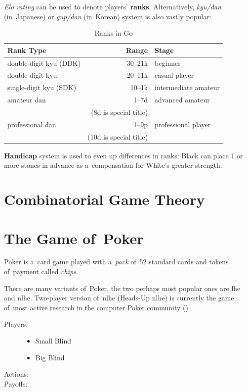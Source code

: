 \emph{Elo rating} can be used to denote players' \textbf{ranks}.
Alternatively, \emph{kyu/dan} (in~Japanese) or \emph{gup/dan} (in~Korean) system is also vastly popular:
\begin{table}[!htbp]
  \centering
  \begin{tabular}{ |l|r|l| }
    \hline
    \textbf{Rank Type} & \textbf{Range} & \textbf{Stage} \\
    \hline
    double-digit kyu\footnotemark{} (DDK) & 30--21k & beginner \\
    double-digit kyu                      & 20--11k & casual player \\
    single-digit kyu (SDK)                & 10--1k  & intermediate amateur \\
    amateur dan                           & 1--7d   & advanced amateur \\
    ~ & (8d is special title) & ~ \\
    professional dan                      & 1--9p   & professional player \\
    ~ & (10d is special title) & ~ \\
    \hline
  \end{tabular}
  \caption{Ranks in Go}
  \label{tab:Go-ranks}
\end{table}

\textbf{Handicap} system is used to even up differences in ranks:
Black can place 1 or more stones in advance as a~compensation for White's greater strength.

\section{Combinatorial Game Theory}
\label{sec:CGT}
\todo

\section{The Game of~Poker}
\label{sec:Poker}
Poker is a~card game played with a~\emph{pack} of~52 standard cards\footnotemark{} and tokens of~payment called \emph{chips}.

There are many variants of~Poker, the two perhaps most popular ones are \acrfull{lhe} and \acrfull{nlhe}.
Two-player version of~\acrshort{nlhe} (Heads-Up \acrshort{nlhe}) is currently the game of~most active research in the computer Poker community (\cite{Ganzfried2015endgame}).

\begin{description}
  \item [Players:] \todo
    \begin{itemize}
      \item Small Blind
      \item Big Blind
    \end{itemize}

  \item [Actions:] \todo

  \item [Payoffs:] \todo 
\end{description}
\todo
